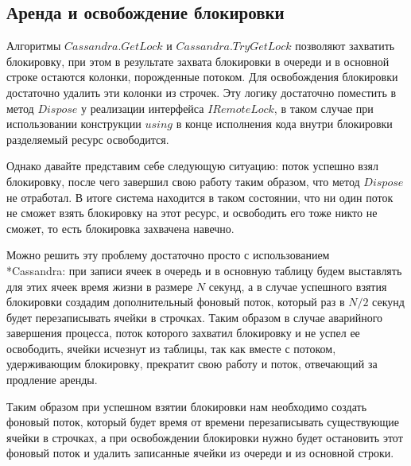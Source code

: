 \subsection{Аренда и освобождение блокировки}

Алгоритмы $Cassandra.GetLock$ и $Cassandra.TryGetLock$ позволяют захватить блокировку, при этом в результате захвата блокировки в очереди и в основной строке остаются колонки, порожденные потоком. Для освобождения блокировки достаточно удалить эти колонки из строчек. Эту логику достаточно поместить в метод $Dispose$ у реализации интерфейса $IRemoteLock$, в таком случае при использовании конструкции $using$ в конце исполнения кода внутри блокировки разделяемый ресурс освободится.

Однако давайте представим себе следующую ситуацию: поток успешно взял блокировку, после чего завершил свою работу таким образом, что метод $Dispose$ не отработал. В итоге система находится в таком состоянии, что ни один поток не сможет взять блокировку на этот ресурс, и освободить его тоже никто не сможет, то есть блокировка захвачена навечно.

Можно решить эту проблему достаточно просто с использованием \\*Cassandra: при записи ячеек в очередь и в основную таблицу будем выставлять для этих ячеек время жизни в размере $N$ секунд, а в случае успешного взятия блокировки создадим дополнительный фоновый поток, который раз в $N/2$ секунд будет перезаписывать ячейки в строчках. Таким образом в случае аварийного завершения процесса, поток которого захватил блокировку и не успел ее освободить, ячейки исчезнут из таблицы, так как вместе с потоком, удерживающим блокировку, прекратит свою работу и поток, отвечающий за продление аренды.

Таким образом при успешном взятии блокировки нам необходимо создать фоновый поток, который будет время от времени перезаписывать существующие ячейки в строчках, а при освобождении блокировки нужно будет остановить этот фоновый поток и удалить записанные ячейки из очереди и из основной строки.
